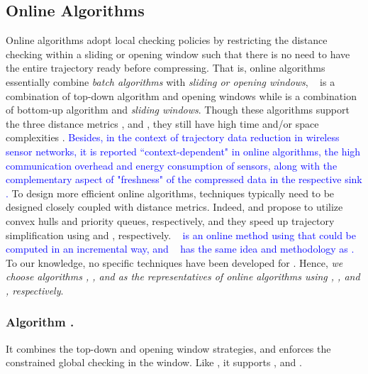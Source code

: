 \subsection{Online Algorithms}

Online \lsa algorithms adopt local checking policies by restricting the distance checking within a sliding or opening window such that there is no need to have the entire trajectory ready before compressing. That is, online algorithms essentially combine {\em batch algorithms} with {\em sliding or opening windows}, \eg\
\opwa \cite{Meratnia:Spatiotemporal} is a combination of top-down algorithm \dpa and opening windows while  \cite{Keogh:online} is a combination of bottom-up algorithm \tpa and \textit{sliding windows}.
Though these algorithms support the three distance metrics \ped, \sed and \dad, they still have high time and/or space complexities \cite{Liu:BQS}.
\textcolor{blue}{Besides, in the context of trajectory data reduction in wireless sensor networks, it is reported ``context-dependent" in online algorithms, \ie the high communication overhead and energy consumption of sensors, along with the complementary aspect of "freshness" of the compressed data in the respective sink \cite{Ghica:DTracking}.}
To design more efficient online algorithms, techniques typically need to be designed closely coupled with distance metrics.
Indeed, \bqsa \cite{Liu:BQS} and \squishe \cite{Muckell:Compression} propose to utilize convex hulls and priority queues, respectively, and they speed up trajectory simplification using \ped and \sed, respectively. 
\textcolor{blue}{\dagots~\cite{Cao:Dots} is an online method using \lissed that could be computed in an incremental way, and \olts~\cite{Wu:Graph} has the same idea and methodology as \dagots.}
To our knowledge, no specific techniques have been developed for \dad.
Hence, {\em we choose algorithms \bqsa, \squishe, \textcolor{blue}{\dagots} and \opwa as the representatives of online algorithms using \ped, \sed, \textcolor{blue}{\lissed} and \dad, respectively}.



\subsubsection{Algorithm \opwa \cite{Meratnia:Spatiotemporal}.}
It combines the top-down and opening window strategies, and enforces the constrained global checking in the window. Like \dpa, it supports \ped, \sed and \dad.

